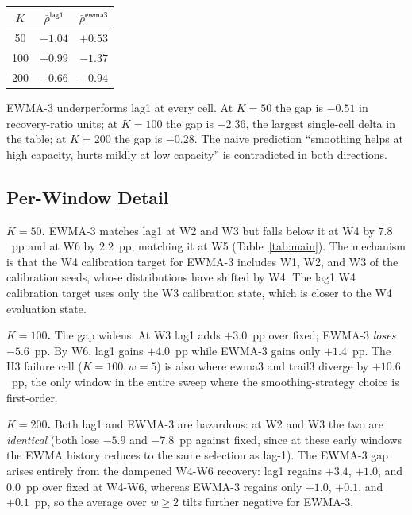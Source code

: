 \begin{center}
\small
\begin{tabular}{ccc}
\toprule
$K$ & $\bar\rho^{\textsf{lag1}}$ & $\bar\rho^{\textsf{ewma3}}$ \\
\midrule
50 & $+1.04$ & $+0.53$ \\
100 & $+0.99$ & $-1.37$ \\
200 & $-0.66$ & $-0.94$ \\
\bottomrule
\end{tabular}
\end{center}

EWMA-3 underperforms \textsf{lag1} at every cell. At $K = 50$ the
gap is $-0.51$ in recovery-ratio units; at $K = 100$ the gap is
$-2.36$, the largest single-cell delta in the table; at $K = 200$ the
gap is $-0.28$. The naive prediction ``smoothing helps at high
capacity, hurts mildly at low capacity'' is contradicted in both directions.

\subsection{Per-Window Detail}

\textbf{$K = 50$.} EWMA-3 matches \textsf{lag1} at W2 and W3 but
falls below it at W4 by $7.8$~pp and at W6 by $2.2$~pp, matching it
at W5 (Table~\ref{tab:main}). The mechanism is that
the W4 calibration target for EWMA-3 includes W1, W2, and W3 of the
calibration seeds, whose distributions have shifted by W4. The
\textsf{lag1} W4 calibration target uses only the W3 calibration
state, which is closer to the W4 evaluation state.

\textbf{$K = 100$.} The gap widens. At W3 \textsf{lag1} adds
$+3.0$~pp over \textsf{fixed}; EWMA-3 \textit{loses} $-5.6$~pp.
By W6, \textsf{lag1} gains $+4.0$~pp while EWMA-3 gains only
$+1.4$~pp. The H3 failure cell ($K = 100, w = 5$) is also where
\textsf{ewma3} and \textsf{trail3} diverge by $+10.6$~pp, 
the only window in the entire sweep where the smoothing-strategy
choice is first-order.

\textbf{$K = 200$.} Both \textsf{lag1} and EWMA-3 are hazardous: at
W2 and W3 the two are \textit{identical} (both lose $-5.9$ and
$-7.8$~pp against \textsf{fixed}, since at these early windows the
EWMA history reduces to the same selection as lag-1). The EWMA-3 gap
arises entirely from the dampened W4-W6 recovery: \textsf{lag1}
regains $+3.4$, $+1.0$, and $0.0$~pp over \textsf{fixed} at W4-W6,
whereas EWMA-3 regains only $+1.0$, $+0.1$, and $+0.1$~pp, so the
average over $w \geq 2$ tilts further negative for EWMA-3.

